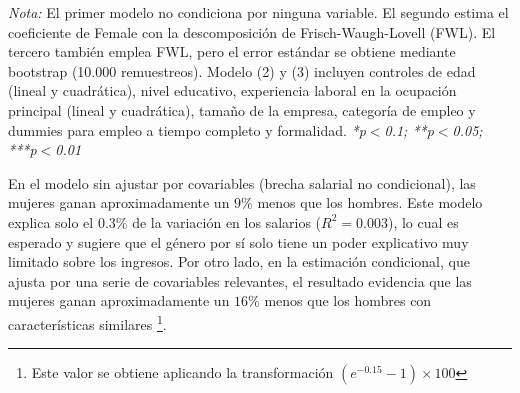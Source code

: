 \documentclass[12pt,a4paper,onecolumn]{article}
\begin{document}
\begin{table}[htbp] 
\centering 
{} 
\caption{The gender earnings GAP} 
\label{tab:gender_gap} 

\vspace{0.2cm} 
\begin{minipage}{0.9\textwidth}  
\footnotesize \scriptsize { \textit{Nota:} El primer modelo no condiciona por ninguna variable.  
El segundo estima el coeficiente de Female con la descomposición de Frisch-Waugh-Lovell (FWL).  
El tercero también emplea FWL, pero el error estándar se obtiene mediante bootstrap (10.000 remuestreos). Modelo (2) y (3) incluyen controles de edad (lineal y cuadrática), nivel educativo, experiencia laboral en la ocupación principal (lineal y cuadrática), tamaño de la empresa, categoría de empleo y dummies para empleo a tiempo completo y formalidad.
\textit{*p$<$0.1; **p$<$0.05; ***p$<$0.01} }
\end{minipage}
\end{table}

En el modelo sin ajustar por covariables (brecha salarial no condicional), las mujeres ganan aproximadamente un \(9\%\) menos que los hombres. Este modelo explica solo el \(0.3\%\) de la variación en los salarios (\(R^2 = 0.003\)), lo cual es esperado y  sugiere que el género por sí solo tiene un poder explicativo muy limitado sobre los ingresos. Por otro lado, en la estimación condicional, que ajusta por una serie de covariables relevantes, el resultado evidencia que las mujeres ganan aproximadamente un \(16\%\) menos que los hombres con características similares \footnote{Este valor se obtiene aplicando la transformación \((e^{-0.15} - 1) \times 100\)}. \\
\end{document}
